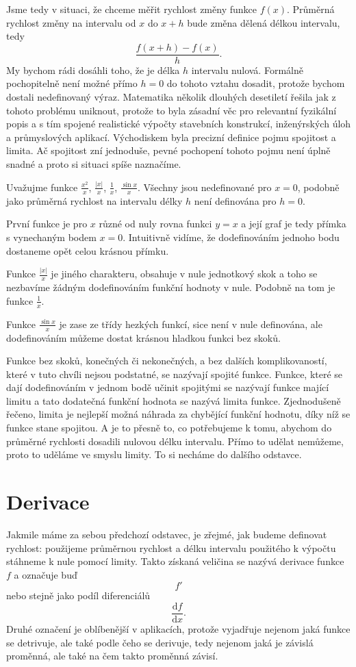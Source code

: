 \documentclass[12pt]{article}
\begin{document}
Jsme tedy v situaci, že chceme měřit rychlost změny funkce $f(x)$. Průměrná rychlost změny na intervalu od $x$ do $x+h$ bude změna dělená délkou intervalu, tedy $$\frac{f(x+h)-f(x)}{h}.$$ My bychom rádi dosáhli toho, že je délka $h$ intervalu nulová. Formálně pochopitelně není možné přímo $h=0$ do tohoto vztahu dosadit, protože bychom dostali nedefinovaný výraz. Matematika několik dlouhých desetiletí řešila jak z tohoto problému uniknout, protože to byla zásadní věc pro relevantní fyzikální popis a s tím spojené realistické výpočty stavebních konstrukcí, inženýrských úloh a průmyslových aplikací. Východiskem byla precizní definice pojmu spojitost a limita. Ač spojitost zní jednoduše, pevné pochopení tohoto pojmu není úplně snadné a proto si situaci spíše naznačíme.

Uvažujme funkce $\frac{x^2}{x}$, $\frac{|x|}{x}$, $\frac 1{x}$, $\frac {\sin x}{x}$. Všechny jsou nedefinované pro $x=0$, podobně jako průměrná rychlost na intervalu délky $h$ není definována pro $h=0$.

První funkce je pro $x$ různé od nuly rovna funkci $y=x$ a její graf je tedy přímka s vynechaným bodem $x=0$. Intuitivně vidíme, že dodefinováním jednoho bodu dostaneme opět celou krásnou přímku.

Funkce $\frac{|x|}{x}$ je jiného charakteru, obsahuje v nule jednotkový skok a toho se nezbavíme žádným dodefinováním funkční hodnoty v nule. Podobně na tom je funkce $\frac 1x$.

Funkce $\frac{\sin x}{x}$ je zase ze třídy hezkých funkcí, sice není v nule definována, ale dodefinováním můžeme dostat krásnou hladkou funkci bez skoků.

Funkce bez skoků, konečných či nekonečných, a bez dalších komplikovaností, které v tuto chvíli nejsou podstatné, se nazývají spojité funkce. Funkce, které se dají dodefinováním v jednom bodě učinit spojitými se nazývají funkce mající limitu a tato dodatečná funkční hodnota se nazývá limita funkce. Zjednodušeně řečeno, limita je nejlepší možná náhrada za chybějící funkční hodnotu, díky níž se funkce stane spojitou. A je to přesně to, co potřebujeme k tomu, abychom do průměrné rychlosti dosadili nulovou délku intervalu. Přímo to udělat nemůžeme, proto to uděláme ve smyslu limity. To si necháme do dalšího odstavce.

\section*{Derivace}

Jakmile máme za sebou předchozí odstavec, je zřejmé, jak budeme definovat rychlost: použijeme průměrnou rychlost a délku intervalu použitého k výpočtu stáhneme k nule pomocí limity. Takto získaná veličina se nazývá derivace funkce $f$ a označuje buď $$f'$$ nebo stejně jako podíl diferenciálů $$\frac{\mathrm df}{\mathrm dx}.$$ Druhé označení je oblíbenější v aplikacích, protože vyjadřuje nejenom jaká funkce se detrivuje, ale také podle čeho se derivuje, tedy nejenom jaká je závislá proměnná, ale také na čem takto proměnná závisí.
\end{document}
